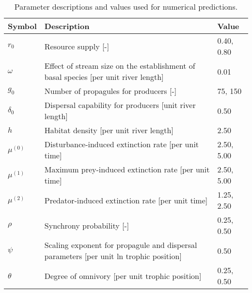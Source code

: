\begin{table}[ht]
\centering
\caption{Parameter descriptions and values used for numerical predictions.} 
\label{tab:parms-num}
\begingroup\small
\begin{tabularx}{\textwidth}{lll}
  \hline
Symbol & Description & Value \\ 
  \hline
$r_0$ & Resource supply [-] & 0.40, 0.80 \\ 
  $\omega$ & Effect of stream size on the establishment of basal species [per unit river length] & 0.01 \\ 
  $g_0$ & Number of propagules for producers [-] & 75, 150 \\ 
  $\delta_0$ & Dispersal capability for producers [unit river length] & 0.50 \\ 
  $h$ & Habitat density [per unit river length] & 2.50 \\ 
  $\mu^{(0)}$ & Disturbance-induced extinction rate [per unit time] & 2.50, 5.00 \\ 
  $\mu^{(1)}$ & Maximum prey-induced extinction rate [per unit time] & 2.50, 5.00 \\ 
  $\mu^{(2)}$ & Predator-induced extinction rate [per unit time] & 1.25, 2.50 \\ 
  $\rho$ & Synchrony probability [-] & 0.25, 0.50 \\ 
  $\psi$ & Scaling exponent for propagule and dispersal parameters [per unit ln trophic position] & 0.50 \\ 
  $\theta$ & Degree of omnivory [per unit trophic position] & 0.25, 0.50 \\ 
   \hline
\end{tabularx}
\endgroup
\end{table}
